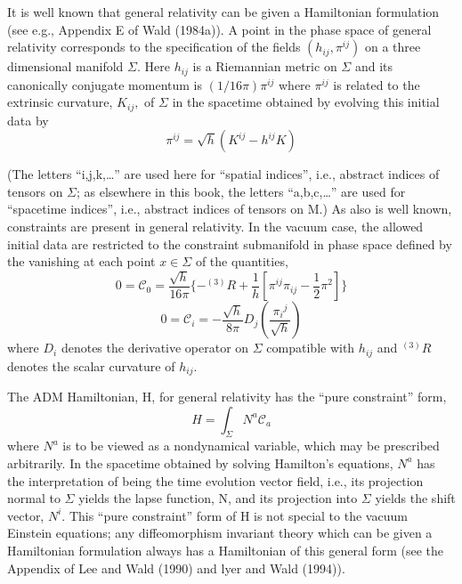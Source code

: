 \documentclass[11pt,a4paper]{article}
\begin{document}
It is well known that general relativity can be given a Hamiltonian formulation (see e.g., Appendix E of Wald (1984a)). A point in the phase space of general relativity corresponds to the specification of the fields \((h_{ij}, \pi^{ij})\) on a three dimensional manifold \(\Sigma.\) Here \(h_{ij}\) is a Riemannian metric on \(\Sigma\) and its canonically conjugate momentum is \((1/16\pi)\pi^{ij}\) where \(\pi^{ij}\) is related to the extrinsic curvature, \(K_{ij},\) of \(\Sigma\) in the spacetime obtained by evolving this initial data by
\begin{equation*}
\pi^{ij} = \sqrt{h} (K^{ij} - h^{ij} K) \tag{6.2.9}\label{eq:6.2.9}
\end{equation*}

(The letters ``i,j,k,\ldots{}'' are used here for ``spatial indices'', i.e., abstract indices of tensors on \(\Sigma\); as elsewhere in this book, the letters ``a,b,c,\ldots{}'' are used for ``spacetime indices'', i.e., abstract indices of tensors on M.) As also is well known, constraints are present in general relativity. In the vacuum case, the allowed initial data are restricted to the constraint submanifold in phase space defined by the vanishing at each point \(x \in \Sigma\) of the quantities,
\begin{equation*}
0=\mathcal C_0=\frac{\sqrt h}{16\pi}\{-{}^{(3)}R+\frac1h[\pi^{ij}\pi_{ij}-\frac12\pi^2]\} \tag{6.2.10}\label{eq:6.2.10}
\end{equation*}
\begin{equation*}
0=\mathcal C_i=-\frac{\sqrt h}{8\pi} D_j\left(\frac{\pi_i{}^j}{\sqrt h}\right) \tag{6.2.11}\label{eq:6.2.11}
\end{equation*}
where \(D_i\) denotes the derivative operator on \(\Sigma\) compatible with \(h_{ij}\) and \(^{(3)}R\) denotes the scalar curvature of \(h_{ij}\).

\hypertarget{source-157}{}

The ADM Hamiltonian, H, for general relativity has the ``pure constraint'' form,
\begin{equation*}
H=\int_\Sigma N^a\mathcal C_a \tag{6.2.12}\label{eq:6.2.12}
\end{equation*}
where \(N^a\) is to be viewed as a nondynamical variable, which may be prescribed arbitrarily. In the spacetime obtained by solving Hamilton's equations, \(N^a\) has the interpretation of being the time evolution vector field, i.e., its projection normal to \(\Sigma\) yields the lapse function, N, and its projection into \(\Sigma\) yields the shift vector, \(N^i\). This ``pure constraint'' form of H is not special to the vacuum Einstein equations; any diffeomorphism invariant theory which can be given a Hamiltonian formulation always has a Hamiltonian of this general form (see the Appendix of Lee and Wald (1990) and lyer and Wald (1994)).
\end{document}
